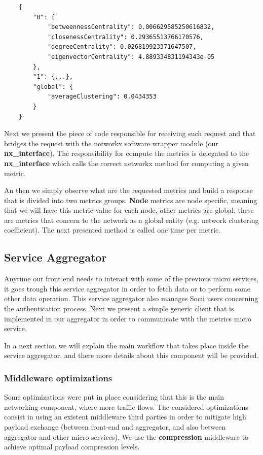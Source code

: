 \begin{verbatim}
    {
        "0": {
            "betweennessCentrality": 0.006629585250616832,
            "closenessCentrality": 0.29365513766170576,
            "degreeCentrality": 0.026819923371647507,
            "eigenvectorCentrality": 4.889334831194343e-05
        },
        "1": {...},
        "global": {
            "averageClustering": 0.0434353
        }
    }
\end{verbatim}

Next we present the piece of code responsible for receiving such request and that bridges the request with the networkx software wrapper module (our \textbf{nx\_interface}). The responsibility for compute the metrics is delegated to the \textbf{nx\_interface} which calls the correct networkx method for computing a given metric.



An then we simply observe what are the requested metrics and build a response that is divided into two metrics groups. \textbf{Node} metrics are node specific, meaning that we will have this metric value for each node, other metrics are global, these are metrics that concern to the network as a global entity (e.g. network clustering coefficient). The next presented method is called one time per metric.



\subsection{Service Aggregator}
Anytime our front end needs to interact with some of the previous micro services, it goes trough this service aggregator
in order to fetch data or to perform some other data operation. This service aggregator also manages Socii users concerning the authentication process.
Next we present a simple generic client that is implemented in our aggregator in order to communicate with the metrics micro service.



In a next section we will explain the main workflow that takes place inside the service aggregator, and there more details about this component will be provided.

\subsubsection{Middleware optimizations}
Some optimizations were put in place considering that this is the main networking component, where more traffic flows. The considered optimizations consist in using an existent middleware third parties in order to mitigate high payload exchange (between front-end and aggregator, and also between aggregator and other micro services). We use the \textbf{compression} \cite{compression} middleware to achieve optimal payload compression levels.

